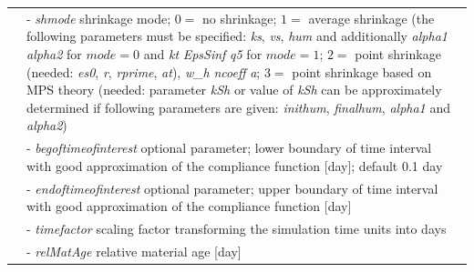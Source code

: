 \documentclass[a4paper]{article}
\newcommand{\param}[1]{{\it #1}}
\newenvironment{mmt}{\begin{tabular}{|l|p{9cm}|}}{\end{tabular}\\}
\newenvironment{mmt}{\begin{tabular}{|l|l|}}{\end{tabular}\\}
\begin{document}
\begin{table}[!htb]
\begin{mmt}
&- \param{shmode} shrinkage mode;
$0=$ no shrinkage;
$1=$ average shrinkage (the following parameters must be specified:
\param{ks}, \param{vs}, \param{hum} and additionally  \param{alpha1} \param{alpha2} for $mode = 0$
and \param{kt} \param{EpsSinf} \param{q5} for $mode = 1$;
$2=$ point shrinkage (needed: \param{es0}, \param{r}, \param{rprime},
\param{at}), \param{w\_h} \param{ncoeff} \param{a};
$3=$ point shrinkage based on MPS theory (needed: parameter \param{kSh} or value of \param{kSh} can be approximately determined if following parameters are given: \param{inithum}, \param{finalhum}, \param{alpha1} and \param{alpha2})\\

&- \param{begoftimeofinterest} optional parameter; lower boundary of time interval with good approximation of the compliance function
[day]; default 0.1 day\\
&- \param{endoftimeofinterest} optional parameter; upper boundary of
time interval with good approximation of the compliance function
[day]\\

&- \param{timefactor} scaling factor transforming the simulation time units into days\\
&- \param{relMatAge} relative material age [day]\\
\hline
\end{mmt}
\end{table}
\end{document}
